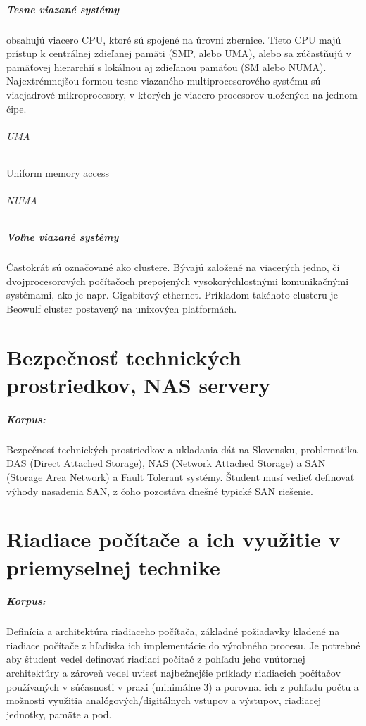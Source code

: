 \documentclass[11pt,a4paper]{report}
\begin{document}
\paragraph{Tesne viazané systémy} obsahujú viacero CPU, ktoré sú spojené na úrovni zbernice. Tieto CPU majú prístup k centrálnej zdieľanej pamäti (SMP, alebo UMA), alebo sa zúčastňujú v pamäťovej hierarchií s lokálnou aj zdieľanou pamäťou (SM alebo NUMA). Najextrémnejšou formou tesne viazaného multiprocesorového systému sú viacjadrové mikroprocesory, v ktorých je viacero procesorov uložených na jednom čipe.
\subparagraph{UMA} Uniform memory access
\subparagraph{NUMA}

\paragraph{Voľne viazané systémy} Častokrát sú označované ako clustere. Bývajú založené na viacerých jedno, či dvojprocesorových počítačoch prepojených vysokorýchlostnými komunikačnými systémami, ako je napr. Gigabitový ethernet. Príkladom takéhoto clusteru je Beowulf cluster postavený na unixových platformách. 


\chapter{Bezpečnosť technických prostriedkov, NAS servery}
\paragraph{Korpus:}Bezpečnosť technických prostriedkov a ukladania dát na Slovensku, problematika DAS (Direct Attached Storage), NAS (Network Attached Storage) a SAN (Storage Area Network) a Fault Tolerant systémy. Študent musí vedieť definovať výhody nasadenia SAN, z čoho pozostáva dnešné typické SAN riešenie. 

\chapter{Riadiace počítače a ich využitie v priemyselnej technike}
\paragraph{Korpus:} Definícia a architektúra riadiaceho počítača, základné požiadavky kladené na riadiace počítače z hľadiska ich implementácie do výrobného procesu. Je potrebné aby študent vedel definovať riadiaci počítač z pohľadu jeho vnútornej architektúry a zároveň vedel uviesť najbežnejšie príklady riadiacich počítačov používaných v súčasnosti v praxi (minimálne 3) a porovnal ich z pohľadu počtu a možnosti využitia analógových/digitálnych vstupov a výstupov, riadiacej jednotky, pamäte a pod.
\end{document}
